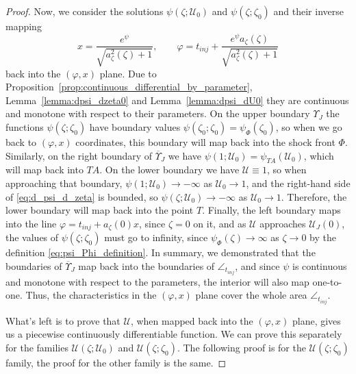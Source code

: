 \documentclass[10pt,a4paper]{amsart}
\begin{document}
\begin{proof}
Now, we consider the solutions $\psi(\zeta; \mathcal U_0)$ and $\psi(\zeta; \zeta_0)$ and their inverse mapping
\[
x = \frac{e^\psi}{\sqrt{a_\zeta^2(\zeta) + 1}}, \qquad \varphi = t_{inj} + \frac{e^{\psi}a_\zeta(\zeta)}{\sqrt{a_\zeta^2(\zeta) + 1}}
\]
back into the $(\varphi, x)$ plane. Due to Proposition~\ref{prop:continuous_differential_by_parameter}, Lemma~\ref{lemma:dpsi_dzeta0} and Lemma~\ref{lemma:dpsi_dU0} they are continuous and monotone with respect to their parameters. On the upper boundary $\Upsilon_J$ the functions $\psi(\zeta; \zeta_0)$ have boundary values $\psi(\zeta_0; \zeta_0) = \psi_\Phi(\zeta_0)$, so when we go back to $(\varphi, x)$ coordinates, this boundary will map back into the shock front $\Phi$. Similarly, on the right boundary of $\overline{\Upsilon}_J$ we have $\psi(1; \mathcal U_0) = \psi_{TA}(\mathcal U_0)$, which will map back into $TA$. On the lower boundary we have $\mathcal U \equiv 1$, so when approaching that boundary, $\psi(1; \mathcal U_0) \to -\infty$ as $\mathcal U_0\to 1$, and the right-hand side of \eqref{eq:d_psi_d_zeta} is bounded, so $\psi(\zeta; \mathcal U_0) \to -\infty$ as $\mathcal U_0\to 1$. Therefore, the lower boundary will map back into the point $T$. Finally, the left boundary maps into the line $\varphi = t_{inj}+a_\zeta(0)x$, since $\zeta = 0$ on it, and as $\mathcal U$ approaches $\mathcal U_J(0)$, the values of $\psi(\zeta; \zeta_0)$ must go to infinity, since $\psi_\Phi(\zeta) \to \infty$ as $\zeta\to 0$ by the definition \eqref{eq:psi_Phi_definition}.
In summary, we demonstrated that the boundaries of $\overline{\Upsilon}_J$ map back into the boundaries of $\angle_{t_{inj}}$, and since $\psi$ is continuous and monotone with respect to the parameters, the interior will also map one-to-one. Thus, the characteristics in the $(\varphi, x)$ plane cover the whole area $\angle_{t_{inj}}$.

What's left is to prove that $\mathcal U$, when mapped back into the $(\varphi, x)$ plane, gives us a piecewise continuously differentiable function. We can prove this separately for the families $\mathcal U(\zeta; \mathcal U_0)$ and $\mathcal U(\zeta; \zeta_0)$. The following proof is for the $\mathcal U(\zeta; \zeta_0)$ family, the proof for the other family is the same.


\end{proof}
\end{document}
